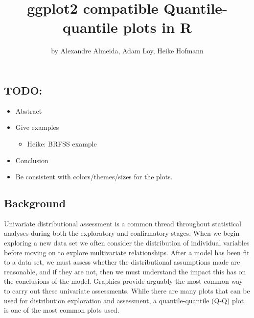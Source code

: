 \title{ggplot2 compatible Quantile-quantile plots in R}
\author{by Alexandre Almeida, Adam Loy, Heike Hofmann}

\maketitle


\newcommand{\hh}[1]{{\textcolor{orange}{#1}}}
\newcommand{\al}[1]{{\textcolor{violet}{#1}}}
\newcommand{\alex}[1]{{\textcolor{green}{#1}}}

\subsection{TODO:}\label{todo}

\begin{itemize}
\item
  Abstract
\item
  Give examples

  \begin{itemize}
  \tightlist
  \item
    Heike: BRFSS example
  \end{itemize}
\item
  Conclusion
\item
  Be consistent with colors/themes/sizes for the plots.
\end{itemize}

\subsection{Background}\label{background}

\label{sec:background}

Univariate distributional assessment is a common thread throughout
statistical analyses during both the exploratory and confirmatory
stages. When we begin exploring a new data set we often consider the
distribution of individual variables before moving on to explore
multivariate relationships. After a model has been fit to a data set, we
must assess whether the distributional assumptions made are reasonable,
and if they are not, then we must understand the impact this has on the
conclusions of the model. Graphics provide arguably the most common way
to carry out these univariate assessments. While there are many plots
that can be used for distribution exploration and assessment, a
quantile-quantile (Q-Q) plot \citep{Wilk1968-ii} is one of the most
common plots used.

